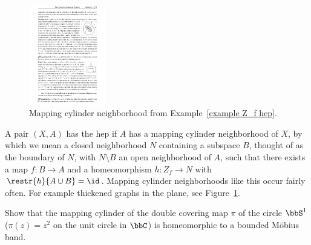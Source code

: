 \begin{figure}[tp]
    \centering
    \includegraphics[width=0.3\textwidth]{figures/hep_example.pdf}
    \caption{Mapping cylinder neighborhood from Example~\ref{example Z_f hep}.}
    \label{fig: Z_f hep}
\end{figure}
\begin{example}\label{example Z_f hep}
    A pair $(X,A)$ has the \gls{hep} if $A$ has a mapping cylinder neighborhood of $X$, by which we mean a closed neighborhood $N$ containing a subspace $B$, thought of as the boundary of $N$, with $N\setminus B$ an open neighborhood of $A$, such that there exists a map $f:B\to A$ and a homeomorphism $h:Z_f\to N$ with $\restr{h}{A\cup B}=\id$. Mapping cylinder neighborhoods like this occur fairly often. For example thickened graphs in the plane, see Figure~\ref{fig: Z_f hep}.
\end{example}

\begin{xca}
    Show that the mapping cylinder of the double covering map $\pi$ of the circle $\bbS^1$ ($\pi(z)=z^2$ on the unit circle in $\bbC$) is homeomorphic to a bounded M\"obius band.
\end{xca}


